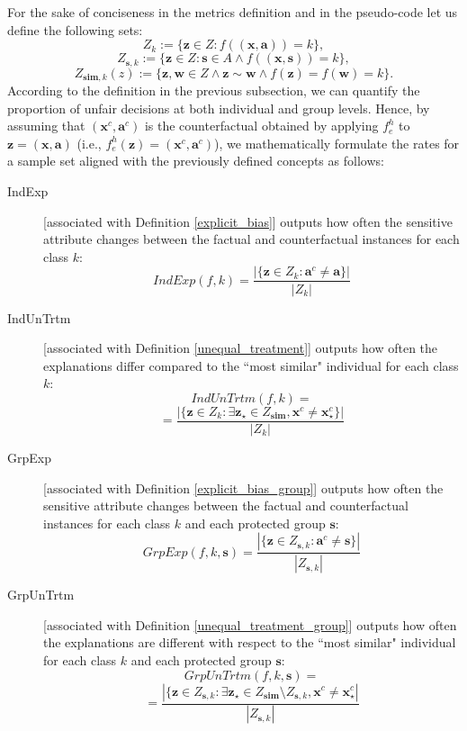\documentclass[letterpaper]{article} %
\begin{document}
For the sake of conciseness in the metrics definition and in the pseudo-code let us define the following sets:
\begin{equation*}
	Z_{k} := \{ \boldsymbol{z} \in Z : f((\boldsymbol{x}, \boldsymbol{a})) = k \},
\end{equation*}
%
\begin{equation*}
	Z_{\boldsymbol{s}, k} := \{ \boldsymbol{z} \in Z : \boldsymbol{s} \in A \wedge f((\boldsymbol{x}, \boldsymbol{s})) = k \},
\end{equation*}
%
\begin{equation*}
	Z_{\boldsymbol{sim}, k} (z) := \{ \boldsymbol{z}, \boldsymbol{w} \in Z \wedge \boldsymbol{z} \sim \boldsymbol{w} \wedge f(\boldsymbol{z}) = f(\boldsymbol{w}) = k\}.
\end{equation*}
% 
According to the definition in the previous subsection, we can quantify the proportion of unfair decisions at both individual and group levels.
%
Hence, by assuming that $(\boldsymbol{x}^{c}, \boldsymbol{a}^{c})$ is the counterfactual obtained by applying $f_e^h$ to $\boldsymbol{z}=(\boldsymbol{x}, \boldsymbol{a})$ (i.e., $f_e^h(\boldsymbol{z}) = (\boldsymbol{x}^{c}, \boldsymbol{a}^{c})$), we mathematically formulate the rates for a sample set aligned with the previously defined concepts as follows:
\begin{description}
	\item[IndExp] [associated with Definition \ref{explicit_bias}] outputs how often the sensitive attribute changes between the factual and counterfactual instances for each class $k$:
	$$IndExp(f,k) = \frac{|\{ \boldsymbol{z} \in Z_{k} : \boldsymbol{a}^{c} \neq \boldsymbol{a} \} |}
	{|Z_{k}|}$$
	\item[IndUnTrtm] [associated with Definition \ref{unequal_treatment}] outputs how often the explanations differ compared to the ``most similar" individual for each class $k$:
	$$IndUnTrtm(f,k) = $$
	$$ = \frac{|\{ \boldsymbol{z} \in Z_{k} : 
		\exists \boldsymbol{z}_{\star} \in Z_{\boldsymbol{sim}}, \boldsymbol{x}^{c} \neq \boldsymbol{x}_{\star}^{c} \}|}
	{|Z_{k}|}$$
	\item[GrpExp] [associated with Definition \ref{explicit_bias_group}] outputs how often the sensitive attribute changes between the factual and counterfactual instances for each class $k$ and each protected group $\boldsymbol{s}$:
	$$GrpExp(f, k, \boldsymbol{s}) = \frac{|\{ \boldsymbol{z} \in Z_{\boldsymbol{s}, k} : \boldsymbol{a}^{c} \neq \boldsymbol{s} \} |}
	{|Z_{\boldsymbol{s}, k}|}$$
	\item[GrpUnTrtm] [associated with Definition \ref{unequal_treatment_group}] outputs how often the explanations are different with respect to the ``most similar" individual for each class $k$ and each protected group $\boldsymbol{s}$:
	$$GrpUnTrtm(f, k, \boldsymbol{s}) = $$
	$$ = \frac{|\{ \boldsymbol{z} \in Z_{\boldsymbol{s}, k} : 
		\exists \boldsymbol{z}_{\star} \in Z_{\boldsymbol{sim}} \setminus Z_{\boldsymbol{s}, k}, \boldsymbol{x}^{c} \neq \boldsymbol{x}_{\star}^{c} |}
	{|Z_{\boldsymbol{s}, k}|}$$
\end{description}
\end{document}
